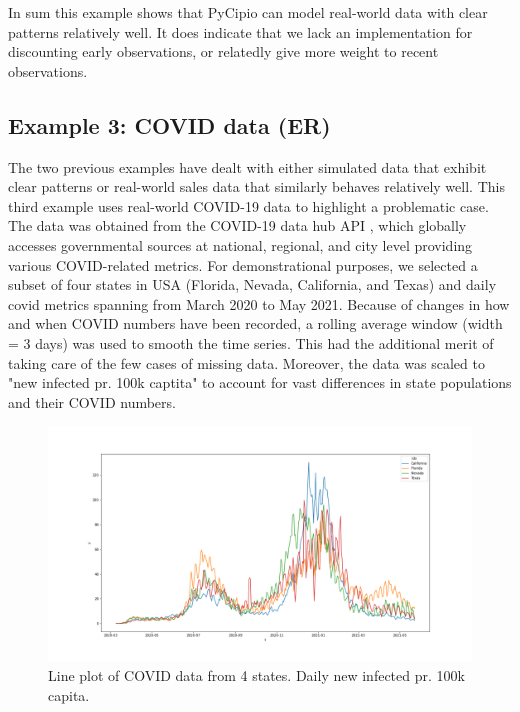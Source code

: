 \documentclass{article}
\begin{document}
\noindent In sum this example shows that PyCipio can model real-world data with clear patterns relatively well. It does indicate that we lack an implementation for discounting early observations, or relatedly give more weight to recent observations. 

\subsection{Example 3: COVID data (ER)}

\noindent The two previous examples have dealt with either simulated data that exhibit clear patterns or real-world sales data that similarly behaves relatively well. This third example uses real-world COVID-19 data to highlight a problematic case. The data was obtained from the COVID-19 data hub API \cite{COVID-19-data-hub}, which globally accesses governmental sources at national, regional, and city level providing various COVID-related metrics. For demonstrational purposes, we selected a subset of four states in USA (Florida, Nevada, California, and Texas) and daily covid metrics spanning from March 2020 to May 2021. Because of changes in how and when COVID numbers have been recorded, a rolling average window (width = 3 days) was used to smooth the time series. This had the additional merit of taking care of the few cases of missing data. Moreover, the data was scaled to "new infected pr. 100k captita" to account for vast differences in state populations and their COVID numbers.  

\begin{figure}[H]
    \centerline{\includegraphics[scale = 0.45]{../plots/ex3_raw_data.png}}
    \caption{Line plot of COVID data from 4 states. Daily new infected pr. 100k capita.}
\end{figure}
\end{document}
